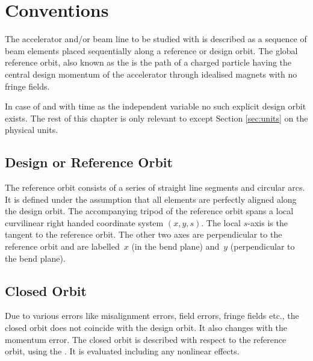 \chapter{Conventions}

\label{sec:definitions}
The accelerator and/or beam line to be studied with \opalmap is described as
a sequence of beam elements placed sequentially along a reference or
design orbit.
The global reference orbit, also known as the  
is the path of a charged particle having the central design momentum 
of the accelerator through idealised magnets with no fringe fields.

In case of \opalt and \opalcycl with time as the independent variable no such 
explicit design orbit exists. The rest of this chapter is only relevant to 
\opalmap except Section \ref{sec:units} on the physical units. 


\section{Design or Reference Orbit}
The reference orbit consists of a series of
straight line segments and circular arcs.
It is defined under the assumption that all elements are
perfectly aligned along the design orbit.
The accompanying tripod of the reference orbit spans
a local curvilinear right handed coordinate system $(x,y,s)$.
The local $s$-axis is the tangent to the reference orbit.
The other two axes are perpendicular to the reference orbit and
are labelled~$x$ (in the bend plane)
and~$y$ (perpendicular to the bend plane).

\section{Closed Orbit}
Due to various errors like misalignment errors, field errors,
fringe fields etc.,
the closed orbit does not coincide with the design orbit.
It also changes with the momentum error.
The closed orbit is described with respect to the reference orbit, 
using the .
It is evaluated including any nonlinear effects.

